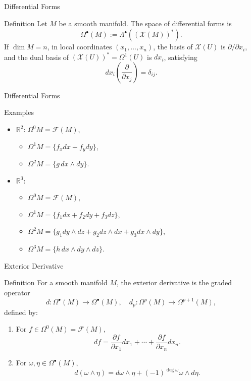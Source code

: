 \begin{frame}{Differential Forms}
\begin{block}{Definition}
Let $M$ be a smooth manifold.
The space of differential forms is
\[
\Omega^{\bullet}(M) := \Lambda^{\bullet}((\mathcal{X}(M))^*).
\]
If $\dim M=n$, in local coordinates $(x_1,\dots,x_n)$,
the basis of $\mathcal{X}(U)$ is $\partial/\partial x_i$, and the dual basis of $(\mathcal{X}(U))^*=\Omega^1(U)$ is $dx_i$, satisfying
\[
dx_i\!\left(\frac{\partial}{\partial x_j}\right)=\delta_{ij}.
\]
\end{block}
\end{frame}

\begin{frame}{Differential Forms}
    \begin{exampleblock}{Examples}
\begin{itemize}
\item $\mathbb{R}^2$: $\Omega^0M=\mathcal{F}(M)$,\\
\begin{itemize}
\item $\Omega^1M=\{f_xdx+f_ydy\}$,\\
\item$\Omega^2M=\{g\,dx\wedge dy\}$.
\end{itemize}
\item $\mathbb{R}^3$:
\begin{itemize}
\item $\Omega^0M=\mathcal{F}(M)$,\\
\item $\Omega^1M=\{f_1dx+f_2dy+f_3dz\}$,\\
\item $\Omega^2M=\{g_1dy\wedge dz+g_2dz\wedge dx+g_3dx\wedge dy\}$,\\
\item $\Omega^3M=\{h\,dx\wedge dy\wedge dz\}$.
\end{itemize}
\end{itemize}
\end{exampleblock}
\end{frame}


\begin{frame}{Exterior Derivative}
\begin{block}{Definition}
For a smooth manifold $M$, the exterior derivative is the graded operator
\[
d:\Omega^{\bullet}(M)\to\Omega^{\bullet}(M),
\quad d_p:\Omega^p(M)\to\Omega^{p+1}(M),
\]
defined by:
\begin{enumerate}
\item For $f\in\Omega^0(M)=\mathcal{F}(M)$,
\[
df=\frac{\partial f}{\partial x_1}dx_1+\cdots+\frac{\partial f}{\partial x_n}dx_n.
\]
\item For $\omega,\eta\in\Omega^{\bullet}(M)$,
\[
d(\omega\wedge\eta)=d\omega\wedge\eta+(-1)^{\deg\omega}\omega\wedge d\eta.
\]
\end{enumerate}
\end{block}

\end{frame}

